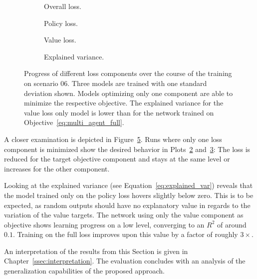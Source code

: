 \begin{figure}[H]
\begin{subfigure}{.5\textwidth}
  \centering
  \scalebox{0.55}{
  
  }
  \caption{Overall loss.}
  \label{fig:overall_loss}
\end{subfigure}
\begin{subfigure}{.5\textwidth}
  \centering
  \scalebox{0.55}{
  
  }
  \caption{Policy loss.}
  \label{fig:policy_loss}
\end{subfigure}

\begin{subfigure}{.5\textwidth}
  \centering
  \scalebox{0.55}{
  
  }
  \caption{Value loss.}
  \label{fig:value_loss}
\end{subfigure}
\begin{subfigure}{.5\textwidth}
  \centering
  \scalebox{0.55}{
  
  }
  \caption{Explained variance.}
  \label{fig:explained_var_loss}
\end{subfigure}
\caption[Loss components during training]{Progress of different loss components over the course of the training on scenario 06. Three models are trained with one standard deviation shown. Models optimizing only one component are able to minimize the respective objective. The explained variance for the value loss only model is lower than for the network trained on Objective~\ref{eq:multi_agent_full}.}
\label{fig:loss_comps}
\end{figure}
A closer examination is depicted in Figure~\ref{fig:loss_comps}. Runs where only one loss component is minimized show the desired behavior in Plots~\ref{fig:policy_loss} and~\ref{fig:value_loss}: The loss is reduced for the target objective component and stays at the same level or increases for the other component.

Looking at the explained variance (see Equation~\ref{eq:explained_var}) reveals that the model trained only on the policy loss hovers slightly below zero. This is to be expected, as random outputs should have no explanatory value in regards to the variation of the value targets. The network using only the value component as objective shows learning progress on a low level, converging to an $R^2$ of around $0.1$. Training on the full loss improves upon this value by a factor of roughly $3 \times$.

An interpretation of the results from this Section is given in Chapter~\ref{ssec:interpretation}. The evaluation concludes with an analysis of the generalization capabilities of the proposed approach.

